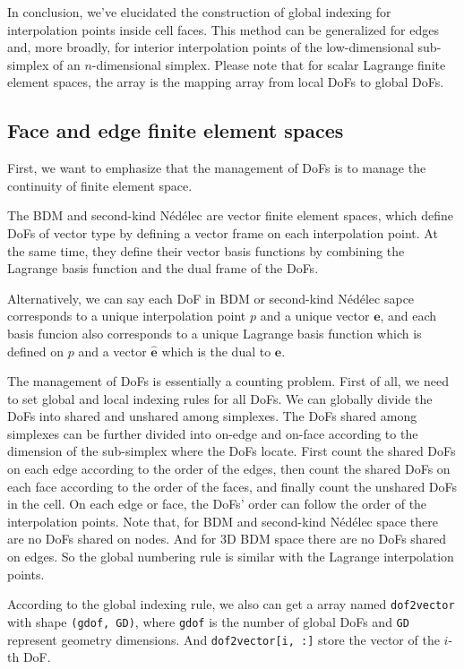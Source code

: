 \documentclass[mathpazo]{cicp}
\begin{document}
In conclusion, we've elucidated the construction of global indexing for
interpolation points inside cell faces. This method can be generalized for edges
and, more broadly, for interior interpolation points of the low-dimensional
sub-simplex of an \(n\)-dimensional simplex. Please note that for scalar
Lagrange finite element spaces, the  array is the mapping array
from local DoFs to global DoFs.



\subsection{Face  and edge finite element spaces}

First, we want to emphasize that the management of DoFs is to manage the
continuity of finite element space.  

The BDM and  second-kind N\'ed\'elec are vector finite element spaces, which define DoFs of
vector type by defining a vector frame on each interpolation point.
At the same time, they define their vector basis functions by combining the Lagrange
basis function and the dual frame of the DoFs.

Alternatively, we can say each DoF in BDM or second-kind N\'ed\'elec sapce corresponds to a unique interpolation point
$p$ and a unique vector $\boldsymbol e$, and each basis funcion also corresponds
to a unique Lagrange basis function which is defined on $p$ and a vector
$\hat{\boldsymbol e}$ which is the dual to  $\boldsymbol e$. 

The management of DoFs is essentially a counting problem. First of all, we need
to set global and local indexing rules for all DoFs. 
We can globally divide the DoFs into shared and unshared among simplexes. The
DoFs shared among simplexes can be further divided into on-edge and on-face
according to the dimension of the sub-simplex where the DoFs locate. First count the shared DoFs on
each edge according to the order of the edges, then count the shared DoFs on
each face according to the order of the faces, and finally count the unshared
DoFs in the cell. On each edge or face, the DoFs' order can follow the order of
the interpolation points. Note
that, for BDM and second-kind N\'ed\'elec space there are no DoFs shared on nodes. And for
3D BDM space there are no DoFs shared on edges. So the global numbering rule is
similar with the Lagrange interpolation points. 

According to the global indexing rule, we also can get a array named
\lstinline{dof2vector} with shape \lstinline{(gdof, GD)}, where \lstinline{gdof}
is the number of global DoFs and \lstinline{GD} represent geometry dimensions.
And \lstinline{dof2vector[i, :]} store the vector of the $i$-th DoF.
\end{document}

